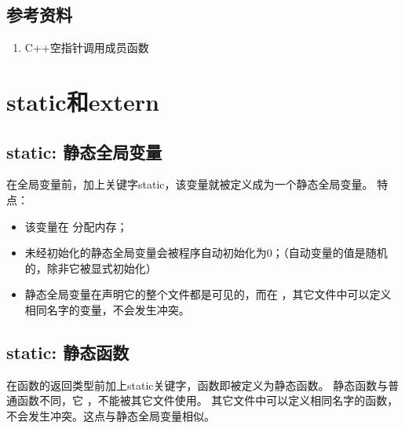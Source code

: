 \documentclass[letterpaper,10pt,english]{sphinxmanual}
\begin{document}
\subsection{参考资料}
\label{\detokenize{cpp/13_nullClassPtr:id3}}\begin{enumerate}
\item {} 
C++空指针调用成员函数

\end{enumerate}
\begin{quote}

\end{quote}


\section{static和extern}
\label{\detokenize{cpp/14_staticExtern:staticextern}}\label{\detokenize{cpp/14_staticExtern::doc}}

\subsection{static: 静态全局变量}
\label{\detokenize{cpp/14_staticExtern:static}}
在全局变量前，加上关键字static，该变量就被定义成为一个静态全局变量。
特点：
\begin{itemize}
\item {} 
该变量在  分配内存；

\item {} 
未经初始化的静态全局变量会被程序自动初始化为0；（自动变量的值是随机的，除非它被显式初始化）

\item {} 
静态全局变量在声明它的整个文件都是可见的，而在  ，其它文件中可以定义相同名字的变量，不会发生冲突。

\end{itemize}


\subsection{static: 静态函数}
\label{\detokenize{cpp/14_staticExtern:id1}}
在函数的返回类型前加上static关键字，函数即被定义为静态函数。
静态函数与普通函数不同，它  ，不能被其它文件使用。
其它文件中可以定义相同名字的函数，不会发生冲突。这点与静态全局变量相似。
\end{document}

